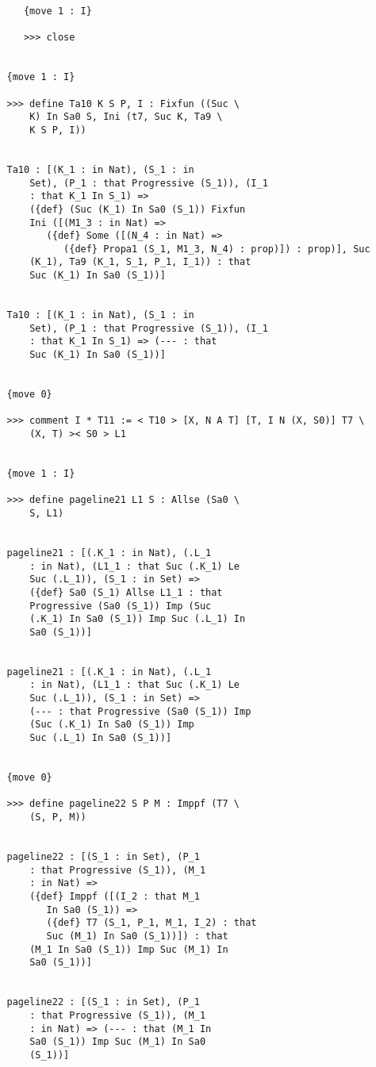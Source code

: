 \documentclass{article}
\begin{document}
\begin{verbatim}
      {move 1 : I}

      >>> close


   {move 1 : I}

   >>> define Ta10 K S P, I : Fixfun ((Suc \
       K) In Sa0 S, Ini (t7, Suc K, Ta9 \
       K S P, I))


   Ta10 : [(K_1 : in Nat), (S_1 : in 
       Set), (P_1 : that Progressive (S_1)), (I_1 
       : that K_1 In S_1) => 
       ({def} (Suc (K_1) In Sa0 (S_1)) Fixfun 
       Ini ([(M1_3 : in Nat) => 
          ({def} Some ([(N_4 : in Nat) => 
             ({def} Propa1 (S_1, M1_3, N_4) : prop)]) : prop)], Suc 
       (K_1), Ta9 (K_1, S_1, P_1, I_1)) : that 
       Suc (K_1) In Sa0 (S_1))]


   Ta10 : [(K_1 : in Nat), (S_1 : in 
       Set), (P_1 : that Progressive (S_1)), (I_1 
       : that K_1 In S_1) => (--- : that 
       Suc (K_1) In Sa0 (S_1))]


   {move 0}

   >>> comment I * T11 := < T10 > [X, N A T] [T, I N (X, S0)] T7 \
       (X, T) >< S0 > L1


   {move 1 : I}

   >>> define pageline21 L1 S : Allse (Sa0 \
       S, L1)


   pageline21 : [(.K_1 : in Nat), (.L_1 
       : in Nat), (L1_1 : that Suc (.K_1) Le 
       Suc (.L_1)), (S_1 : in Set) => 
       ({def} Sa0 (S_1) Allse L1_1 : that 
       Progressive (Sa0 (S_1)) Imp (Suc 
       (.K_1) In Sa0 (S_1)) Imp Suc (.L_1) In 
       Sa0 (S_1))]


   pageline21 : [(.K_1 : in Nat), (.L_1 
       : in Nat), (L1_1 : that Suc (.K_1) Le 
       Suc (.L_1)), (S_1 : in Set) => 
       (--- : that Progressive (Sa0 (S_1)) Imp 
       (Suc (.K_1) In Sa0 (S_1)) Imp 
       Suc (.L_1) In Sa0 (S_1))]


   {move 0}

   >>> define pageline22 S P M : Imppf (T7 \
       (S, P, M))


   pageline22 : [(S_1 : in Set), (P_1 
       : that Progressive (S_1)), (M_1 
       : in Nat) => 
       ({def} Imppf ([(I_2 : that M_1 
          In Sa0 (S_1)) => 
          ({def} T7 (S_1, P_1, M_1, I_2) : that 
          Suc (M_1) In Sa0 (S_1))]) : that 
       (M_1 In Sa0 (S_1)) Imp Suc (M_1) In 
       Sa0 (S_1))]


   pageline22 : [(S_1 : in Set), (P_1 
       : that Progressive (S_1)), (M_1 
       : in Nat) => (--- : that (M_1 In 
       Sa0 (S_1)) Imp Suc (M_1) In Sa0 
       (S_1))]



\end{verbatim}
\end{document}
